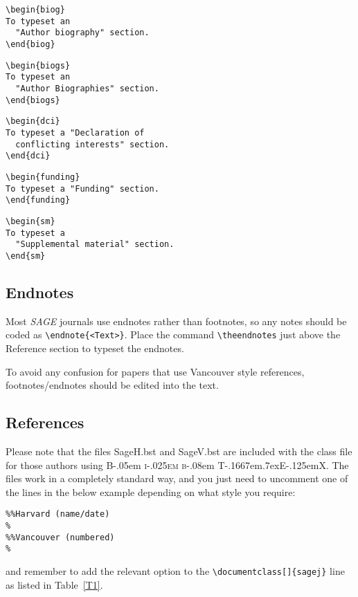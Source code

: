 \documentclass[Afour,sageh,times]{sagej}
\newcommand\BibTeX{{\rmfamily B\kern-.05em \textsc{i\kern-.025em b}\kern-.08em
T\kern-.1667em\lower.7ex\hbox{E}\kern-.125emX}}
\begin{document}
\begin{verbatim}
\begin{biog}
To typeset an
  "Author biography" section.
\end{biog}
\end{verbatim}

\begin{verbatim}
\begin{biogs}
To typeset an
  "Author Biographies" section.
\end{biogs}
\end{verbatim}


\begin{verbatim}
\begin{dci}
To typeset a "Declaration of
  conflicting interests" section.
\end{dci}
\end{verbatim}

\begin{verbatim}
\begin{funding}
To typeset a "Funding" section.
\end{funding}
\end{verbatim}

\begin{verbatim}
\begin{sm}
To typeset a
  "Supplemental material" section.
\end{sm}
\end{verbatim}

\subsection{Endnotes}
Most \textit{SAGE} journals use endnotes rather than footnotes, so any notes should be coded as \verb+\endnote{<Text>}+.
Place the command \verb+\theendnotes+ just above the Reference section to typeset the endnotes.

To avoid any confusion for papers that use Vancouver style references,  footnotes/endnotes should be edited into the text.

\subsection{References}
Please note that the files \textsf{SageH.bst} and \textsf{SageV.bst} are included with the class file
for those authors using \BibTeX.
The files work in a completely standard way, and you just need to uncomment one of the lines in the below example depending on what style you require:
\begin{verbatim}
%%Harvard (name/date)
%
%%Vancouver (numbered)
%

\end{verbatim}
and remember to add the relevant option to the \verb+\documentclass[]{sagej}+ line as listed in Table~\ref{T1}.
\end{document}
